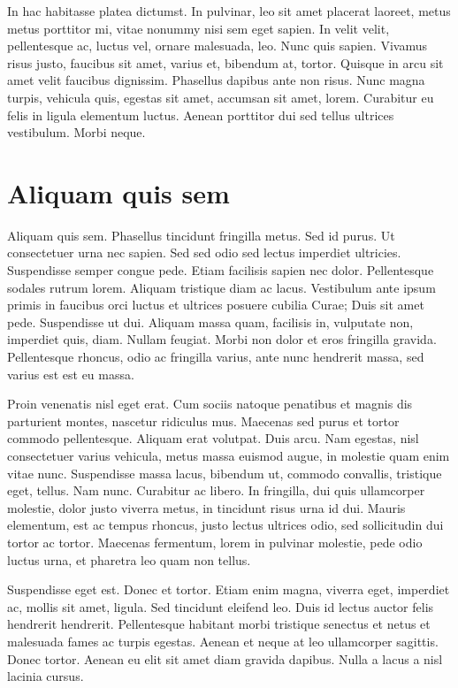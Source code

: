 \documentclass[eng,printmode]{mgr}
\begin{document}
In hac habitasse platea dictumst. In pulvinar, leo sit amet placerat laoreet, metus metus porttitor mi, vitae nonummy nisi sem eget sapien. In velit velit, pellentesque ac, luctus vel, ornare malesuada, leo. Nunc quis sapien. Vivamus risus justo, faucibus sit amet, varius et, bibendum at, tortor. Quisque in arcu sit amet velit faucibus dignissim. Phasellus dapibus ante non risus. Nunc magna turpis, vehicula quis, egestas sit amet, accumsan sit amet, lorem. Curabitur eu felis in ligula elementum luctus. Aenean porttitor dui sed tellus ultrices vestibulum. Morbi neque. 

\section{Aliquam quis sem}
Aliquam quis sem. Phasellus tincidunt fringilla metus. Sed id purus. Ut consectetuer urna nec sapien. Sed sed odio sed lectus imperdiet ultricies. Suspendisse semper congue pede. Etiam facilisis sapien nec dolor. Pellentesque sodales rutrum lorem. Aliquam tristique diam ac lacus. Vestibulum ante ipsum primis in faucibus orci luctus et ultrices posuere cubilia Curae; Duis sit amet pede. Suspendisse ut dui. Aliquam massa quam, facilisis in, vulputate non, imperdiet quis, diam. Nullam feugiat. Morbi non dolor et eros fringilla gravida. Pellentesque rhoncus, odio ac fringilla varius, ante nunc hendrerit massa, sed varius est est eu massa. 

Proin venenatis nisl eget erat. Cum sociis natoque penatibus et magnis dis parturient montes, nascetur ridiculus mus. Maecenas sed purus et tortor commodo pellentesque. Aliquam erat volutpat. Duis arcu. Nam egestas, nisl consectetuer varius vehicula, metus massa euismod augue, in molestie quam enim vitae nunc. Suspendisse massa lacus, bibendum ut, commodo convallis, tristique eget, tellus. Nam nunc. Curabitur ac libero. In fringilla, dui quis ullamcorper molestie, dolor justo viverra metus, in tincidunt risus urna id dui. Mauris elementum, est ac tempus rhoncus, justo lectus ultrices odio, sed sollicitudin dui tortor ac tortor. Maecenas fermentum, lorem in pulvinar molestie, pede odio luctus urna, et pharetra leo quam non tellus.

Suspendisse eget est. Donec et tortor. Etiam enim magna, viverra eget, imperdiet ac, mollis sit amet, ligula. Sed tincidunt eleifend leo. Duis id lectus auctor felis hendrerit hendrerit. Pellentesque habitant morbi tristique senectus et netus et malesuada fames ac turpis egestas. Aenean et neque at leo ullamcorper sagittis. Donec tortor. Aenean eu elit sit amet diam gravida dapibus. Nulla a lacus a nisl lacinia cursus. 
\end{document}
